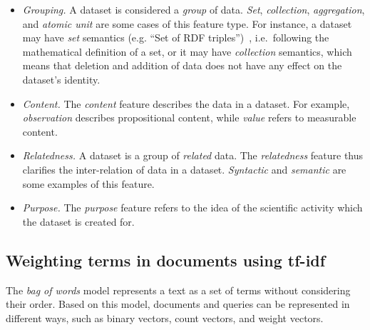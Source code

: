 \documentclass{IOS-Book-Article}
\begin{document}
\begin{itemize}
	\item \emph{Grouping.} A dataset is considered a \emph{group} of data.
		\emph{Set}, \emph{collection}, \emph{aggregation}, and \emph{atomic unit} are some cases of this feature type.
		For instance, a dataset may have \emph{set} semantics (e.g. “Set of RDF triples”)~\cite{renear2010definitions}, i.e.\ following the mathematical definition of a set, or it may have \emph{collection} semantics, which means that deletion and addition of data does not have any effect on the dataset's identity.
	\item \emph{Content.} The \emph{content} feature describes the data in a dataset.
		For example, \emph{observation} describes propositional content, while \emph{value} refers to measurable content.
	\item \emph{Relatedness.} A dataset is a group of \emph{related} data.
		The \emph{relatedness} feature thus clarifies the inter-relation of data in a dataset.
		\emph{Syntactic} and \emph{semantic} are some examples of this feature.   
	\item \emph{Purpose.} The \emph{purpose} feature refers to the idea of the scientific activity which the dataset is created for.
\end{itemize}

\subsection{Weighting terms in documents using tf-idf}
\label{sec:tfidf}
The \emph{bag of words} model represents a text as a set of terms without considering their order.
Based on this model, documents and queries can be represented in different ways, such as binary vectors, count vectors, and weight vectors.
\end{document}
